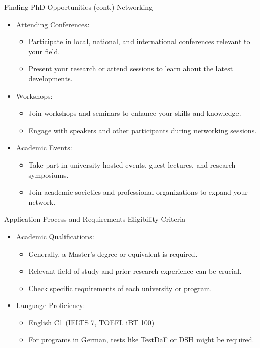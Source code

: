 \documentclass[10pt]{beamer}
\begin{document}
\begin{frame}[fragile]{Finding PhD Opportunities (cont.)}
\alert{Networking}
	\begin{itemize}
		\item Attending Conferences:
		\begin{itemize}
			\item Participate in local, national, and international conferences relevant to your field.
			\item Present your research or attend sessions to learn about the latest developments.
		\end{itemize}
		\item Workshops:
		\begin{itemize}
			\item Join workshops and seminars to enhance your skills and knowledge.
			\item Engage with speakers and other participants during networking sessions.
		\end{itemize}
		\item Academic Events:
		\begin{itemize}
			\item Take part in university-hosted events, guest lectures, and research symposiums.
			\item Join academic societies and professional organizations to expand your network.
		\end{itemize}
	\end{itemize}
	
\end{frame}


\begin{frame}[fragile]{Application Process and Requirements}
\alert{Eligibility Criteria}
\begin{itemize}
	\item Academic Qualifications: 
	\begin{itemize}
		\item Generally, a Master’s degree or equivalent is required.
		\item Relevant field of study and prior research experience can be crucial.
		\item Check specific requirements of each university or program.
	\end{itemize}
	\item Language Proficiency:
	\begin{itemize}
		\item English C1 (IELTS 7, TOEFL iBT 100)
		\item For programs in German, tests like TestDaF or DSH might be required.
	\end{itemize}
\end{itemize}
\end{frame}
\end{document}

